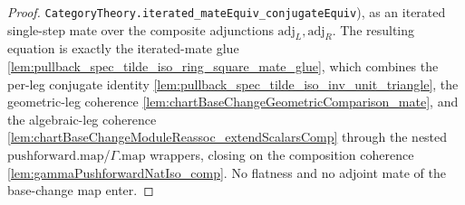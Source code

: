 \begin{lemma}
\begin{proof}
    \texttt{CategoryTheory.iterated\_mateEquiv\_conjugateEquiv}), as an iterated single-step mate over
    the composite adjunctions \(\mathrm{adj}_L,\mathrm{adj}_R\). The resulting equation is exactly the
    iterated-mate glue \cref{lem:pullback_spec_tilde_iso_ring_square_mate_glue}, which combines the
    per-leg conjugate identity \cref{lem:pullback_spec_tilde_iso_inv_unit_triangle}, the geometric-leg
    coherence \cref{lem:chartBaseChangeGeometricComparison_mate}, and the algebraic-leg coherence
    \cref{lem:chartBaseChangeModuleReassoc_extendScalarsComp} through the nested
    \(\mathrm{pushforward}.\mathrm{map}\)/\(\Gamma.\mathrm{map}\) wrappers, closing on the composition
    coherence \cref{lem:gammaPushforwardNatIso_comp}. No flatness and no adjoint mate of the base-change
    map enter.
  \end{proof}
\end{lemma}

